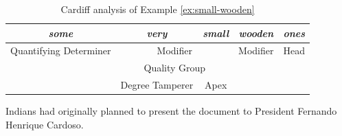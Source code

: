 \begin{table}[H]
    \centering
    \begin{tabular}{c|c|c|cc}
        \hline
        \multicolumn{1}{|c|}{\textit{some}}          & \textit{very}     & \textit{small} & \multicolumn{1}{c|}{\textit{wooden}} & \multicolumn{1}{c|}{\textit{ones}} \\ \hline
        \multicolumn{1}{|c|}{Quantifying Determiner} & \multicolumn{2}{c|}{Modifier}      & \multicolumn{1}{c|}{Modifier}        & \multicolumn{1}{c|}{Head}          \\ \hline
        & \multicolumn{2}{c|}{Quality Group} &                                      &                                    \\ \cline{2-3}
        & Degree Tamperer & Apex           &                                      &                                    \\ \cline{2-3}
    \end{tabular}
    \caption{Cardiff analysis of Example \ref{ex:small-wooden}}
    \label{tab:example-substructure-analisys-cardiff}
\end{table}


\begin{exe}
    \ex \label{ex:indians-planned} Indians had originally planned to present the document to President Fernando Henrique Cardoso.
\end{exe}


\begin{table}[!ht]
    \centering
    \caption{Sydney grammar Mood analysis of Example \ref{ex:indians-planned}}
    \label{tab:indians-planned-sydney}
\end{table}

